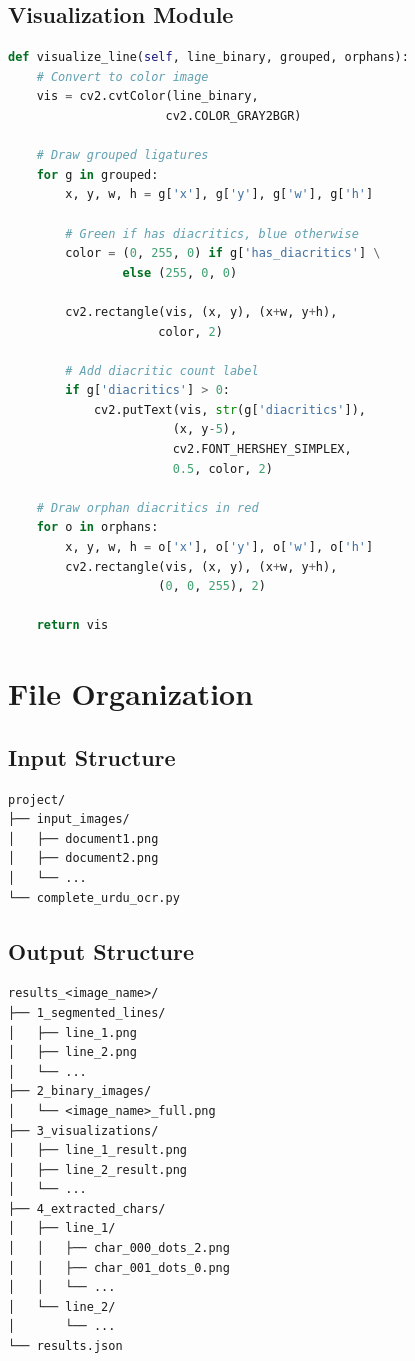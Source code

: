\documentclass[12pt,a4paper,oneside]{report}
\begin{document}
\subsection{Visualization Module}

\begin{lstlisting}[language=Python, caption=Visualization Implementation]
def visualize_line(self, line_binary, grouped, orphans):
    # Convert to color image
    vis = cv2.cvtColor(line_binary, 
                      cv2.COLOR_GRAY2BGR)
    
    # Draw grouped ligatures
    for g in grouped:
        x, y, w, h = g['x'], g['y'], g['w'], g['h']
        
        # Green if has diacritics, blue otherwise
        color = (0, 255, 0) if g['has_diacritics'] \
                else (255, 0, 0)
        
        cv2.rectangle(vis, (x, y), (x+w, y+h), 
                     color, 2)
        
        # Add diacritic count label
        if g['diacritics'] > 0:
            cv2.putText(vis, str(g['diacritics']),
                       (x, y-5),
                       cv2.FONT_HERSHEY_SIMPLEX,
                       0.5, color, 2)
    
    # Draw orphan diacritics in red
    for o in orphans:
        x, y, w, h = o['x'], o['y'], o['w'], o['h']
        cv2.rectangle(vis, (x, y), (x+w, y+h),
                     (0, 0, 255), 2)
    
    return vis
\end{lstlisting}

\section{File Organization}

\subsection{Input Structure}
\begin{verbatim}
project/
├── input_images/
│   ├── document1.png
│   ├── document2.png
│   └── ...
└── complete_urdu_ocr.py
\end{verbatim}

\subsection{Output Structure}
\begin{verbatim}
results_<image_name>/
├── 1_segmented_lines/
│   ├── line_1.png
│   ├── line_2.png
│   └── ...
├── 2_binary_images/
│   └── <image_name>_full.png
├── 3_visualizations/
│   ├── line_1_result.png
│   ├── line_2_result.png
│   └── ...
├── 4_extracted_chars/
│   ├── line_1/
│   │   ├── char_000_dots_2.png
│   │   ├── char_001_dots_0.png
│   │   └── ...
│   └── line_2/
│       └── ...
└── results.json
\end{verbatim}
\end{document}
